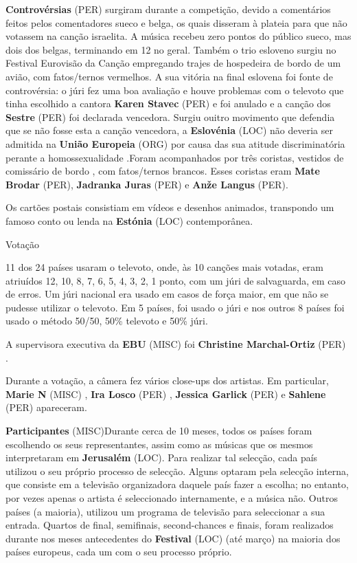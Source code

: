 \documentclass[12pt,a4paper]{article}
\begin{document}
\textbf{Controvérsias} (PER) surgiram durante a competição, devido a comentários feitos pelos comentadores sueco e belga, os quais disseram à plateia para que não votassem na canção israelita. A música recebeu zero pontos do público sueco, mas dois dos belgas, terminando em 12 no geral. Também o trio esloveno surgiu no Festival Eurovisão da Canção empregando trajes de hospedeira de bordo de um avião, com fatos/ternos vermelhos. A sua vitória na final eslovena foi fonte de controvérsia: o júri fez uma boa avaliação e houve problemas com o televoto que tinha escolhido a cantora \textbf{Karen Stavec} (PER) e foi anulado e a canção dos \textbf{Sestre} (PER) foi declarada vencedora. Surgiu ouitro movimento que defendia que se não fosse esta a canção vencedora, a \textbf{Eslovénia} (LOC) não deveria ser admitida na \textbf{União Europeia} (ORG) por causa das sua atitude discriminatória perante a homossexualidade .Foram acompanhados por três coristas, vestidos de comissário de bordo , com fatos/ternos brancos. Esses coristas eram \textbf{Mate Brodar} (PER), \textbf{Jadranka Juras} (PER) e \textbf{Anže Langus} (PER).

Os cartões postais consistiam em vídeos e desenhos animados, transpondo um famoso conto ou lenda na \textbf{Estónia} (LOC) contemporânea.



Votação

11 dos 24 países usaram o televoto, onde, às 10 canções mais votadas, eram atriuídos 12, 10, 8, 7, 6, 5, 4, 3, 2, 1 ponto, com um júri de salvaguarda, em caso de erros. Um júri nacional era usado em casos de força maior, em que não se pudesse utilizar o televoto. Em 5 países, foi usado o júri e nos outros 8 países foi usado o método 50/50, 50\% televoto e 50\% júri.

A supervisora executiva da \textbf{EBU} (MISC) foi \textbf{Christine Marchal-Ortiz} (PER) .

Durante a votação, a câmera fez vários close-ups dos artistas. Em particular, \textbf{Marie N} (MISC) , \textbf{Ira Losco} (PER) , \textbf{Jessica Garlick} (PER) e \textbf{Sahlene} (PER) apareceram.



\textbf{Participantes} (MISC)Durante cerca de 10 meses, todos os países foram escolhendo os seus representantes, assim como as músicas que os mesmos interpretaram em \textbf{Jerusalém} (LOC). Para realizar tal selecção, cada país utilizou o seu próprio processo de selecção. Alguns optaram pela selecção interna, que consiste em a televisão organizadora daquele país fazer a escolha; no entanto, por vezes apenas o artista é seleccionado internamente, e a música não. Outros países (a maioria), utilizou um programa de televisão para seleccionar a sua entrada. Quartos de final, semifinais, second-chances e finais, foram realizados durante nos meses antecedentes do \textbf{Festival} (LOC) (até março) na maioria dos países europeus, cada um com o seu processo próprio.
\end{document}
